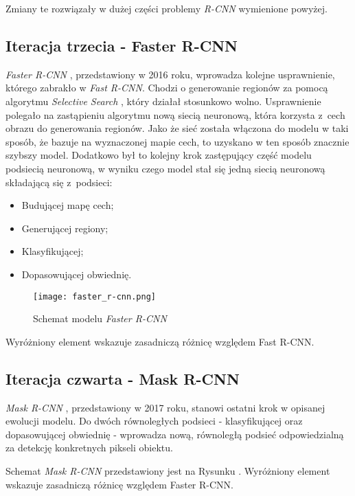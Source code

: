 Zmiany te rozwiązały w dużej części problemy \textit{R-CNN} wymienione powyżej.

\subsection{Iteracja trzecia - Faster R-CNN}

\textit{Faster R-CNN} \cite{faster-rcnn}, przedstawiony w 2016 roku, wprowadza kolejne usprawnienie, którego zabrakło w \textit{Fast R-CNN}.
Chodzi o generowanie regionów za pomocą algorytmu \textit{Selective Search} \cite{selective-search}, który działał stosunkowo wolno.
Usprawnienie polegało na zastąpieniu algorytmu nową siecią neuronową, która korzysta z~cech obrazu do generowania regionów.
Jako że sieć została włączona do modelu w taki sposób, że bazuje na wyznaczonej mapie cech, to uzyskano w ten sposób znacznie szybszy model.
Dodatkowo był to kolejny krok zastępujący część modelu podsiecią neuronową, w wyniku czego model stał się jedną siecią neuronową składającą się z~podsieci:

\begin{itemize}
	\item Budującej mapę cech;
	\item Generującej regiony;
	\item Klasyfikującej;
	\item Dopasowującej obwiednię.
\end{itemize}

\begin{figure}[h]
  \centering
  \caption{Schemat modelu \textit{Faster R-CNN}}
  \texttt{[image: faster\_r-cnn.png]}
  \label{fig:faster_r_cnn}
\end{figure}

Wyróżniony element wskazuje zasadniczą różnicę względem Fast R-CNN.

\newpage
\subsection{Iteracja czwarta - Mask R-CNN}
\label{sec:maskrcnn}
\textit{Mask R-CNN} \cite{matterport-mask-rcnn}, przedstawiony w 2017 roku, stanowi ostatni krok w opisanej ewolucji modelu.
Do dwóch równoległych podsieci - klasyfikującej oraz dopasowującej obwiednię - wprowadza nową, równoległą podsieć odpowiedzialną za detekcję konkretnych pikseli obiektu.

Schemat \textit{Mask R-CNN} przedstawiony jest na Rysunku . Wyróżniony element wskazuje zasadniczą różnicę względem Faster R-CNN.

